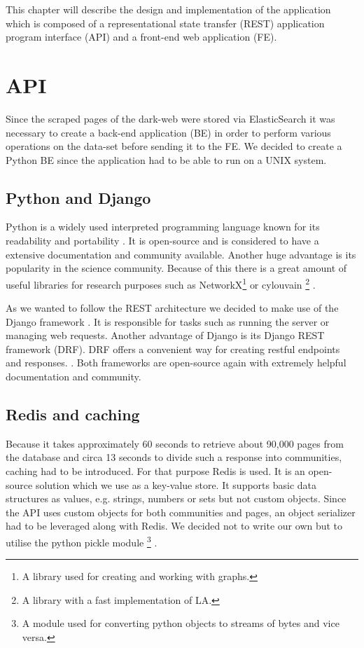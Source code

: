 This chapter will describe the design and implementation of the application which is composed of a representational state transfer (REST) application program interface (API) and a front-end web application (FE). 

\section{API}
Since the scraped pages of the dark-web were stored via ElasticSearch it was necessary to create a back-end application (BE) in order to perform various operations on the data-set before sending it to the FE. We decided to create a Python BE since the application had to be able to run on a UNIX system. 
\subsection{Python and Django}
Python is a widely used interpreted programming language known for its  readability and portability \cite{aboutPython}. It is open-source and is considered to have a extensive documentation and community available. Another huge advantage is its popularity in the science community. Because of this there is a great amount of useful libraries for research purposes such as NetworkX\footnote{A library used for creating and working with graphs.} \cite{NetworkX} or cylouvain \footnote{A library with a fast implementation of LA.} \cite{cylouvain}.  

As we wanted to follow the REST architecture we decided to make use of the Django framework \cite{meetDjango}. It is responsible for tasks such as running the server or managing web requests. Another advantage of Django is its Django REST framework (DRF). DRF offers a convenient way for creating restful endpoints and responses. \cite{djangoRest}. Both frameworks are open-source again with extremely helpful documentation and community. 

\subsection{Redis and caching}
Because it takes approximately 60 seconds to retrieve about 90,000 pages from the database and circa 13 seconds to divide such a response into communities, caching had to be introduced. For that purpose Redis \cite{redis} is used. It is an open-source solution which we use as a key-value store. It supports  basic data structures as values, e.g. strings, numbers or sets but not custom objects. Since the API uses custom objects for both communities and pages, an object serializer had to be leveraged along with Redis. We decided not to write our own but to utilise the python pickle module \footnote{A module used for converting python objects to streams of bytes and vice versa.} \cite{pickle}. 